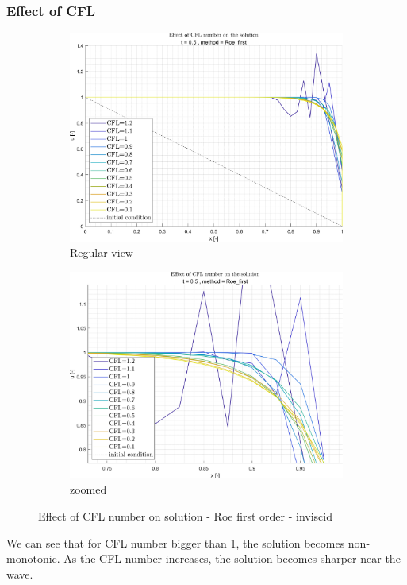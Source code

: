 \documentclass[11pt, a4paper]{article}
\begin{document}
\subsubsection{Effect of CFL}
\begin{figure}[H]
    \centering
    \begin{subfigure}[c]{.49\textwidth}
        \centering
        \includegraphics[width=\textwidth]{images/grap1.png}
        \caption{Regular view}
        \label{fig:roe_first_inviscid_A}
    \end{subfigure}
    \hfill
    \begin{subfigure}[c]{.49\textwidth}
        \centering
        \includegraphics[width=\textwidth]{images/grap1.1.png}
        \caption{zoomed}
        \label{fig:roe_first_inviscid_B}
    \end{subfigure}
    \caption{Effect of CFL number on solution - Roe first order - inviscid}
    \label{fig:roe_first_inviscid}
\end{figure}
We can see that for CFL number bigger than 1, the solution becomes non-monotonic. As the CFL number increases, the solution becomes sharper near the wave.
\end{document}
